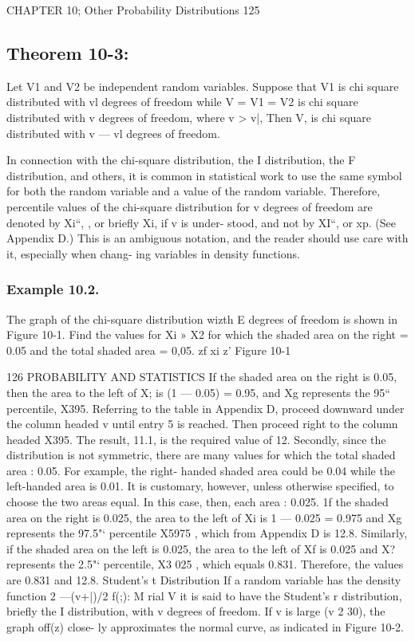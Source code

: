 {{{CHAPTER 10; Other Probability Distributions 125
\subsection*{Theorem 10-3:} Let V1 and V2 be independent random variables.
Suppose that V1 is chi square distributed with vl
degrees of freedom while V = V1 = V2 is chi square
distributed with v degrees of freedom, where v > v|,
Then V, is chi square distributed with v — vl degrees
of freedom.

In connection with the chi-square distribution, the I distribution, the F distribution, and others, it is common in statistical work to use the same symbol for both the random variable and a value of the random variable. Therefore, percentile values of the chi-square distribution for v degrees of freedom are denoted by Xi“, , or brieﬂy Xi, if v is under-
stood, and not by XI“, or xp. (See Appendix D.) This is an ambiguous
notation, and the reader should use care with it, especially when chang-
ing variables in density functions.

\subsubsection{Example 10.2.} The graph of the chi-square distribution wizth E
degrees of freedom is shown in Figure 10-1. Find the values for Xi » X2
for which the shaded area on the right = 0.05 and the total shaded area
= 0,05.
zf xi z’
Figure 10-1



126 PROBABILITY AND STATISTICS
If the shaded area on the right is 0.05, then the area to the left of X; is
(1 — 0.05) = 0.95, and Xg represents the 95“ percentile, X395.
Referring to the table in Appendix D, proceed downward under
the column headed v until entry 5 is reached. Then proceed right to the
column headed X395. The result, 11.1, is the required value of 12.
Secondly, since the distribution is not symmetric, there are many
values for which the total shaded area : 0.05. For example, the right-
handed shaded area could be 0.04 while the left-handed area is 0.01. It
is customary, however, unless otherwise speciﬁed, to choose the two
areas equal. In this case, then, each area : 0.025.
1f the shaded area on the right is 0.025, the area to the left of Xi is
1 — 0.025 = 0.975 and Xg represents the 97.5"‘ percentile X5975 , which
from Appendix D is 12.8.
Similarly, if the shaded area on the left is 0.025, the area to the left
of Xf is 0.025 and X? represents the 2.5"‘ percentile, X3 025 , which
equals 0.831.
Therefore, the values are 0.831 and 12.8.
Student’s t Distribution
If a random variable has the density function
 2 —(v+|)/2
f(;):%
M rial V
it is said to have the Student's r distribution, briefly the I distribution,
with v degrees of freedom. If v is large (v 2 30), the graph off(z) close-
ly approximates the normal curve, as indicated in Figure 10-2.



}}}
